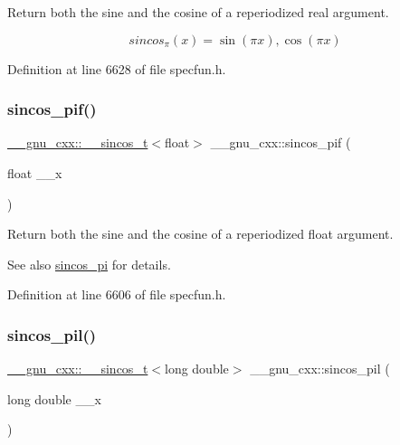 Return both the sine and the cosine of a reperiodized real argument.

\[ sincos_\pi(x) = {\sin(\pi x), \cos(\pi x)} \] 

Definition at line 6628 of file specfun.\+h.

\mbox{\label{group__mathsf__gnu_gacf416c867a8a456f8f0e3d8b45ca8bd5}} 
\subsubsection{\texorpdfstring{sincos\+\_\+pif()}{sincos\_pif()}}
{\footnotesize\ttfamily \hyperlink{struct____gnu__cxx_1_1____sincos__t}{\+\_\+\+\_\+gnu\+\_\+cxx\+::\+\_\+\+\_\+sincos\+\_\+t}$<$float$>$ \+\_\+\+\_\+gnu\+\_\+cxx\+::sincos\+\_\+pif (\begin{DoxyParamCaption}\item[{float}]{\+\_\+\+\_\+x }\end{DoxyParamCaption})\hspace{0.3cm}{\ttfamily [inline]}}

Return both the sine and the cosine of a reperiodized {\ttfamily float} argument.

\begin{DoxySeeAlso}{See also}
\hyperlink{group__mathsf__gnu_ga6553883f127ea0de67041c3128e03813}{sincos\+\_\+pi} for details. 
\end{DoxySeeAlso}


Definition at line 6606 of file specfun.\+h.

\mbox{\label{group__mathsf__gnu_ga1f1efc07313a3de1e994d89c3b83b957}} 
\subsubsection{\texorpdfstring{sincos\+\_\+pil()}{sincos\_pil()}}
{\footnotesize\ttfamily \hyperlink{struct____gnu__cxx_1_1____sincos__t}{\+\_\+\+\_\+gnu\+\_\+cxx\+::\+\_\+\+\_\+sincos\+\_\+t}$<$long double$>$ \+\_\+\+\_\+gnu\+\_\+cxx\+::sincos\+\_\+pil (\begin{DoxyParamCaption}\item[{long double}]{\+\_\+\+\_\+x }\end{DoxyParamCaption})\hspace{0.3cm}{\ttfamily [inline]}}

